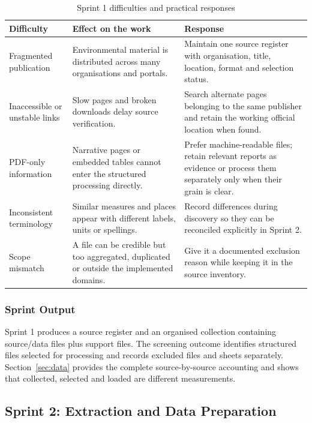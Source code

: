 \begin{table}[H]
\centering
\caption{Sprint 1 difficulties and practical responses}
\label{tab:sprint1-challenges}
\small
\begin{tabular}{L{0.20\textwidth}L{0.28\textwidth}L{0.42\textwidth}}
\toprule
Difficulty & Effect on the work & Response \\
\midrule
Fragmented publication & Environmental material is distributed across many
organisations and portals. & Maintain one source register with organisation,
title, location, format and selection status. \\
Inaccessible or unstable links & Slow pages and broken downloads delay source
verification. & Search alternate pages belonging to the same publisher and
retain the working official location when found. \\
PDF-only information & Narrative pages or embedded tables cannot enter the
structured processing directly. & Prefer machine-readable files; retain relevant
reports as evidence or process them separately only when their grain is clear. \\
Inconsistent terminology & Similar measures and places appear with different
labels, units or spellings. & Record differences during discovery so they can
be reconciled explicitly in Sprint 2. \\
Scope mismatch & A file can be credible but too aggregated, duplicated or
outside the implemented domains. & Give it a documented exclusion reason while
keeping it in the source inventory. \\
\bottomrule
\end{tabular}
\end{table}

\subsubsection{Sprint Output}

Sprint 1 produces a source register and an organised collection containing
\mSourceDataFiles{} source/data files plus \mSupportFiles{} support files. The
screening outcome identifies \mSourceFiles{} structured files selected for
processing and records excluded files and sheets separately. Section~\ref{sec:data}
provides the complete source-by-source accounting and shows that collected,
selected and loaded are different measurements.

\subsection{Sprint 2: Extraction and Data Preparation}
\label{subsec:sprint2}

